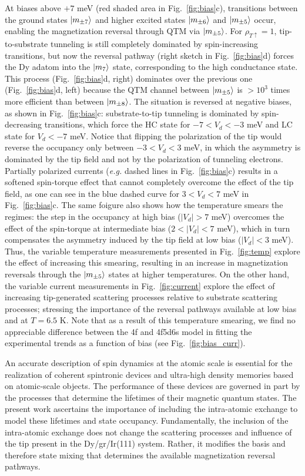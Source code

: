 \documentclass[
reprint,amsmath,amssymb,aps]{revtex4-2}
\begin{document}
At biases above $+7$ meV (red shaded area in Fig.~\ref{fig:bias}c), transitions between the ground states $\ket{m_{\pm7}}$ and higher excited states $\ket{m_{\pm 6}}$ and $\ket{m_{\pm 5}}$ occur, enabling the magnetization reversal through QTM via $\ket{m_{\pm 5}}$. For $\rho_{T \uparrow} = 1 $, tip-to-substrate tunneling is still completely dominated by spin-increasing transitions, but now the reversal pathway (right sketch in Fig.~\ref{fig:bias}d) forces the Dy adatom into the $\ket{m_{7}}$ state, corresponding to the high conductance state. This process (Fig.~\ref{fig:bias}d, right) dominates over the previous one (Fig.~\ref{fig:bias}d, left) because the QTM channel between $\ket{m_{\pm 5}}$ is $>10^3$ times more efficient than between $\ket{m_{\pm 8}}$. 
The situation is reversed at negative biases, as shown in Fig.~\ref{fig:bias}c: substrate-to-tip tunneling is dominated by spin-decreasing transitions, which force the HC state for $-7<V_d<-3$ meV and LC state for $V_d<-7$ meV. Notice that flipping the polarization of the tip would reverse the occupancy only between $-3<V_d<3$ meV, in which the asymmetry is dominated by the tip field and not by the polarization of tunneling electrons. Partially polarized currents (\textit{e.g.} dashed lines in Fig.~\ref{fig:bias}c) results in a softened spin-torque effect that cannot completely overcome the effect of the tip field, as one can see in the blue dashed curve for $3<V_d<7$ meV in Fig.~\ref{fig:bias}c.  The same foigure also shows how the temperature smears the regimes: the step in the occupancy at high bias ($|V_d|>7$ meV) overcomes the effect of the spin-torque at intermediate bias ($2<|V_d|<7$ meV), which in turn compensates the asymmetry induced by the tip field at low bias ($|V_d|<3$ meV). Thus, the variable temperature measurements presented in Fig.~\ref{fig:temp} explore the effect of increasing this smearing, resulting in an increase in magnetization reversals through the $\ket{m_{\pm 5}}$ states at higher temperatures. On the other hand, the variable current measurements in Fig.~\ref{fig:current} explore the effect of increasing tip-generated scattering processes relative to substrate scattering processes; stressing the importance of the reversal pathways available at low bias and at $T=6.5$ K. Note that as a result of this temperature smearing, we find no appreciable difference between the 4f and 4f5d6s model in fitting the experimental trends as a function of bias (see Fig.~\ref{fig:bias_curr}).

An accurate description of spin dynamics at the atomic scale is essential for the realization of coherent spintronic devices and ultra-high density memories based on atomic-scale objects. The performance of these devices are governed in part by the processes that determine the lifetimes of their magnetic quantum states. The present work ascertains the importance of including the intra-atomic exchange to model these lifetimes and state occupancy. Fundamentally, the inclusion of the intra-atomic exchange does not change the scattering processes and influence of the tip present in the Dy/gr/Ir(111) system. Rather, it modifies the basis and therefore state mixing that determines the available magnetization reversal pathways.



\end{document}
